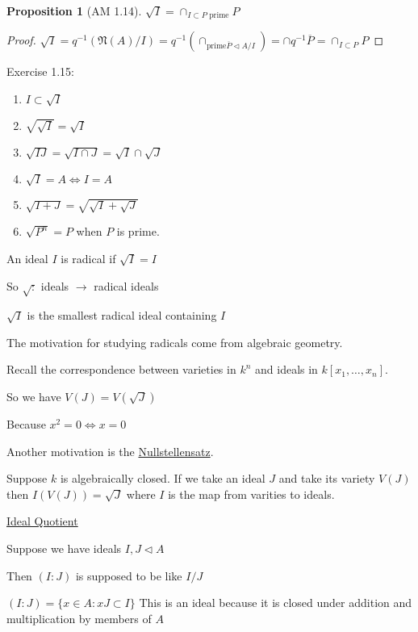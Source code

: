 \documentclass{article}
\theoremstyle{definition}
\newtheorem{proposition}{Proposition}
\begin{document}
\begin{proposition}
    [AM 1.14] \(\sqrt{I} = \cap_{I \subset P\text{ prime} }P\) 
\end{proposition}

\begin{proof}
    \(\sqrt{I} = q^{-1}(\mathfrak{N}(A) / I ) = q^{-1}(\cap_{\text{prime} \overline{P} \triangleleft A / I }) = \cap q^{-1} \overline{P} = \cap_{I \subset P}P \) 
\end{proof}

Exercise 1.15:

\begin{enumerate}
    \item \(I \subset \sqrt{I} \) 
    \item \(\sqrt{\sqrt{I} } =\sqrt{I} \) 
    \item \(\sqrt{IJ} = \sqrt{I\cap J} = \sqrt{I} \cap \sqrt{J} \) 
    \item \(\sqrt{I}= A \iff I = A \)
    \item \(\sqrt{I + J} = \sqrt{\sqrt{I} + \sqrt{J} } \) 
    \item \(\sqrt{P^n} = P \) when \(P\) is prime. 
\end{enumerate}

An ideal \(I\) is radical if \(\sqrt{I} = I\) 

So \(\sqrt : \) ideals \(\to \) radical ideals

\(\sqrt{I} \) is the smallest radical ideal containing \(I\) 

The motivation for studying radicals come from algebraic geometry.

Recall the correspondence between varieties in \(k^n\) and ideals in \(k[x_1, \dots, x_n ]\).

So we have \(V(J)=V(\sqrt{J})\) 

Because \(x^2 = 0 \iff x=0 \) 

Another motivation is the \underline{Nullstellensatz}.

Suppose \(k\) is algebraically closed. If we take an ideal \(J\) and take its variety \(V(J)\) then \(I(V(J))=\sqrt{J} \)  where \(I\) is the map from varities to ideals.

\underline{Ideal Quotient}

Suppose we have ideals \(I,J \triangleleft A\) 

Then \((I : J)\) is supposed to be like \( I / J\) 

\((I : J) = \{ x \in A : xJ \subset I \} \) This is an ideal because it is closed under addition and multiplication by members of \(A\) 
\end{document}
